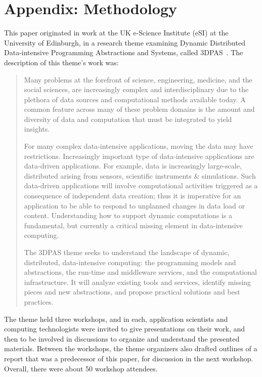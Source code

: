 


\newpage
\appendix
\section*{Appendix: Methodology}

This paper originated in work at the UK e-Science Institute (eSI) at
the University of Edinburgh, in a research theme examining Dynamic
Distributed Data-intensive Programming Abstractions and Systems,
called 3DPAS~\cite{3dpas-theme}.  The description of
this theme's work was:

\begin{quote}
Many problems at the forefront of science, engineering, medicine, and the social sciences, are increasingly complex and interdisciplinary due to the plethora of data sources and computational methods available today. A common feature across many of these problem domains is the amount and diversity of data and computation that must be integrated to yield insights.

For many complex data-intensive applications, moving the data may have restrictions. Increasingly important type of data-intensive applications are data-driven applications. For example, data is increasingly large-scale, distributed arising from sensors, scientific instruments \& simulations. Such data-driven applications will involve computational activities triggered as a consequence of independent data creation; thus it is imperative for an application to be able to respond to unplanned changes in data load or content. Understanding how to support dynamic computations is a fundamental, but currently a critical missing element in data-intensive computing.

The 3DPAS theme seeks to understand the landscape of dynamic, distributed, data-intensive computing: the programming models and abstractions, the run-time and middleware services, and the computational infrastructure. It will analyze existing tools and services, identify missing pieces and new abstractions, and propose practical solutions and best practices.
\end{quote}

The theme held three workshops, and in each, application scientists and
computing technologists were invited to give presentations on their work, and
then to be involved in discussions to organize and understand the presented
materials.  Between the workshops, the theme organizers also drafted outlines of
a report that was a predecessor of this paper, for discussion in the next
workshop.  Overall, there were about 50 workshop attendees.

